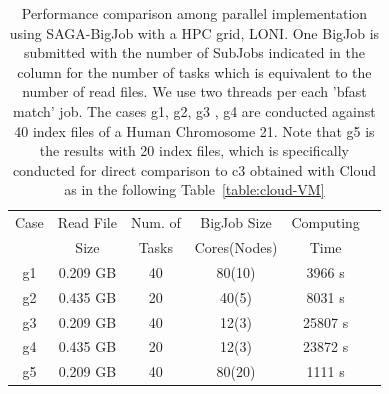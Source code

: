 \documentclass{acm_proc_article-sp}
\begin{document}
 \begin{table}
 \small
 \begin{tabular}{|c|c|c|c|c|c |} 
 \hline 
Case & Read File  &  Num. of & BigJob Size   &  Computing  \\
   & Size & Tasks  & Cores(Nodes)  & Time \\
   \hline
g1 & 0.209 GB  &   40 &  80(10) & 3966 s \\
g2 & 0.435 GB    &  20 & 40(5) & 8031 s\\ \hline
g3  & 0.209 GB & 40  & 12(3) & 25807 s \\
g4 & 0.435 GB & 20  & 12(3) & 23872 s  \\ \hline
\hline
g5 & 0.209 GB & 40 & 80(20) & 1111 s \\

\hline
\end{tabular}
\caption{Performance comparison among parallel implementation using
  SAGA-BigJob with a HPC grid, LONI. One BigJob is submitted with the
  number of SubJobs indicated in the column for the number of tasks
  which is equivalent to the number of read files. We use two threads
  per each 'bfast   match' job. The cases g1, g2, g3 , g4 are conducted against 40 index files of a Human Chromosome 21.  Note that g5 is the results with 20 index files, which is specifically conducted for direct comparison to c3 obtained with Cloud as in the following Table~\ref{table:cloud-VM} }
  
  \label{table:bigjob-loni} 
\end{table}

\end{document}
